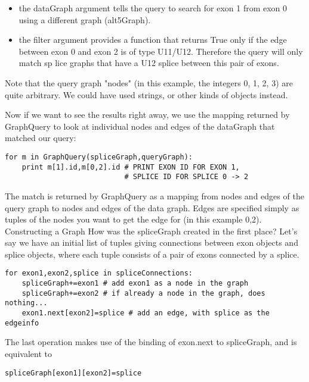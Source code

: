 \documentclass{howto}
\begin{document}
\begin{itemize}
\item
the dataGraph argument tells the query to search for exon 1 from exon 0 using a different graph (alt5Graph).

\item    
the filter argument provides a function that returns True only if the edge between exon 0 and exon 2 is of type U11/U12.  Therefore the query will only match sp
lice graphs that have a U12 splice between this pair of exons.

\end{itemize}

Note that the query graph "nodes" (in this example, the integers 0, 1, 2, 3) are
quite arbitrary.  We could have used strings, or other kinds of objects instead.

Now if we want to see the results right away, we use the mapping returned by GraphQuery to look at individual nodes and edges of the dataGraph that matched our query:

\begin{verbatim}
for m in GraphQuery(spliceGraph,queryGraph):
    print m[1].id,m[0,2].id # PRINT EXON ID FOR EXON 1,
                            # SPLICE ID FOR SPLICE 0 -> 2
\end{verbatim}

The match is returned by GraphQuery as a mapping from nodes and edges of the query graph to nodes and edges of the data graph.  Edges are specified simply as tuples of the nodes you want to get the edge for (in this example 0,2).
Constructing a Graph
How was the spliceGraph created in the first place?  Let's say we have an initial list of tuples giving connections between exon objects and splice objects, where each tuple consists of a pair of exons connected by a splice.

\begin{verbatim}
for exon1,exon2,splice in spliceConnections: 
    spliceGraph+=exon1 # add exon1 as a node in the graph
    spliceGraph+=exon2 # if already a node in the graph, does nothing...
    exon1.next[exon2]=splice # add an edge, with splice as the edgeinfo
\end{verbatim}

The last operation makes use of the binding of exon.next to spliceGraph, and is equivalent to

\begin{verbatim}
spliceGraph[exon1][exon2]=splice
\end{verbatim}
\end{document}
